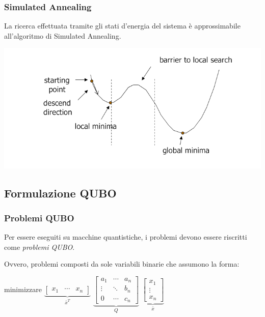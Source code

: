 \documentclass[10pt]{beamer}
\begin{document}
\begin{frame}
  \frametitle{Simulated Annealing}

  La ricerca effettuata tramite gli stati d'energia del sistema è approssimabile all'algoritmo di Simulated Annealing.

  \includegraphics[width=\columnwidth]{img/simulated-annealing}

\end{frame}
\subsection{Formulazione QUBO}
\begin{frame}
  \frametitle{Problemi QUBO}

  Per essere eseguiti su macchine quantistiche, i problemi devono essere riscritti come \emph{problemi QUBO}.

  Ovvero, problemi composti da sole variabili binarie che assumono la forma:

  \begin{center}
    minimizzare 
    $\underbrace{\begin{bmatrix}
        x_1 & \cdots & x_n 
    \end{bmatrix}}_{\bar{x}^T}$ 
    $\underbrace{\begin{bmatrix}
        a_1 & \cdots & a_n \\
        \vdots & \ddots & b_n \\
        0 & \cdots & c_n 
    \end{bmatrix}}_{Q}$ 
    $\underbrace{\begin{bmatrix}
        x_1 \\
        \vdots \\
        x_n 
    \end{bmatrix}}_{\bar{x}}$       
  \end{center}

\end{frame}
\end{document}
